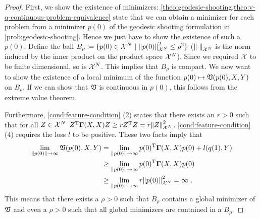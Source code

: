 \begin{proof}
	First, we show the existence of minimizers:
	\cref{theo:geodesic-shooting,theo:v-q-continuous-problem-equivalence} state that we can obtain a minimizer for each problem from a minimizer $p(0)$ of the geodesic shooting formulation in \cref{prob:geodesic-shooting}.
	Hence we just have to show the existence of such a $p(0)$.
	Define the ball $B_\rho \coloneqq \{p(0) \in \mathcal{X}^N\ | \ \norm{p(0)}_{\mathcal{X}^N}^2 \leq \rho^2 \}$ ($\norm{\cdot}_{\mathcal{X}^N}$ is the norm induced by the inner product on the product space $\mathcal{X}^N$).
	Since we required $\mathcal{X}$ to be finite dimensional, so is $\mathcal{X}^N$.
	This implies that $B_\rho$ is compact.
	We now want to show the existence of a local minimum of the function $p(0) \mapsto \mathfrak{V}(p(0), X, Y)$ on $B_\rho$.
	If we can show that $\mathfrak{V}$ is continuous in $p(0)$, this follows from the extreme value theorem.
	
	Furthermore, \cref{cond:feature-condition} (2) states that there exists an $r > 0$ such that for all $Z \in \mathcal{X}^N$ $Z^{\mathrm{T}} \mathbf{\Gamma}(X, X) Z \geq r Z^{\mathrm{T}} Z = r \norm{Z}_{\mathcal{X}^N}^2$.
	\cref{cond:feature-condition} (4) requires the loss $l$ to be positive.
	These two facts imply that
	\begin{align}
		\lim_{\norm{p(0)} \rightarrow \infty} \mathfrak{V}(p(0), X, Y) 
		&= \lim_{\norm{p(0)} \rightarrow \infty} p(0)^{\mathrm{T}} \mathbf{\Gamma}(X, X) p(0) + l(q(1), Y)\\
		& \geq 	\lim_{\norm{p(0)} \rightarrow \infty} p(0)^{\mathrm{T}} \mathbf{\Gamma}(X, X) p(0) \\
		& \geq \lim_{\norm{p(0)} \rightarrow \infty} r \norm{p(0)}_{\mathcal{X}^N}^2
		= \infty \ .
	\end{align}
	This means that there exists a $\rho > 0$ such that $B_\rho$ contains a global minimizer of $\mathfrak{V}$ and even a $\rho > 0$ such that all global minimizers are contained in a $B_\rho$.
	

\end{proof}
